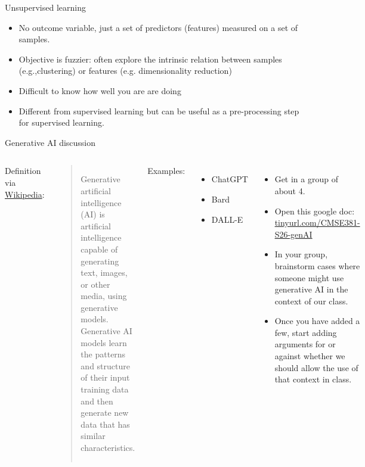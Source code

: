 \documentclass[aspectratio=169,usenames,dvipsnames]{beamer}
\begin{document}
\begin{frame}[c]{Unsupervised learning }

\begin{itemize}
	\item
No outcome variable, just a set of predictors (features) measured on a set of samples.

	\item
Objective is fuzzier: often explore the intrinsic relation between samples (e.g.,clustering) or features (e.g. dimensionality reduction)

	\item
Difficult to know how well you are are doing

	\item
Different from supervised learning but can be useful as a pre-processing step for supervised learning.
\end{itemize}

\end{frame}
{
\begin{frame}[t]{Generative AI discussion}
\begin{columns}
Definition via \href{https://en.wikipedia.org/wiki/Generative_artificial_intelligence}{Wikipedia}:\\ 
\begin{quote}
	Generative artificial intelligence (AI) is artificial intelligence capable of generating text, images, or other media, using generative models.
	Generative AI models learn the patterns and structure of their input training data and then generate new data that has similar characteristics.
\end{quote}

Examples:
\begin{itemize}
	\item ChatGPT
	\item Bard
	\item DALL-E
\end{itemize}
\centering
\begin{itemize}
	\item Get in a group of about 4. 
	\item Open this google doc: \href{https://tinyurl.com/CMSE381-S26-genAI}{tinyurl.com/CMSE381-S26-genAI}
	\item In your group, brainstorm cases where someone might use generative AI in the context of our class. 
	\item Once you have added a few, start adding arguments for or against whether we should allow the use of that context in class. 
\end{itemize}
\end{columns}
\end{frame}
}
\end{document}
